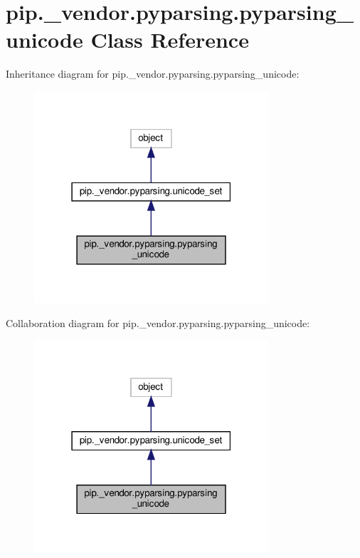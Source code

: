 \hypertarget{classpip_1_1__vendor_1_1pyparsing_1_1pyparsing__unicode}{}\section{pip.\+\_\+vendor.\+pyparsing.\+pyparsing\+\_\+unicode Class Reference}
\label{classpip_1_1__vendor_1_1pyparsing_1_1pyparsing__unicode}


Inheritance diagram for pip.\+\_\+vendor.\+pyparsing.\+pyparsing\+\_\+unicode\+:
\nopagebreak
\begin{figure}[H]
\begin{center}
\leavevmode
\includegraphics[width=247pt]{classpip_1_1__vendor_1_1pyparsing_1_1pyparsing__unicode__inherit__graph}
\end{center}
\end{figure}


Collaboration diagram for pip.\+\_\+vendor.\+pyparsing.\+pyparsing\+\_\+unicode\+:
\nopagebreak
\begin{figure}[H]
\begin{center}
\leavevmode
\includegraphics[width=247pt]{classpip_1_1__vendor_1_1pyparsing_1_1pyparsing__unicode__coll__graph}
\end{center}
\end{figure}
